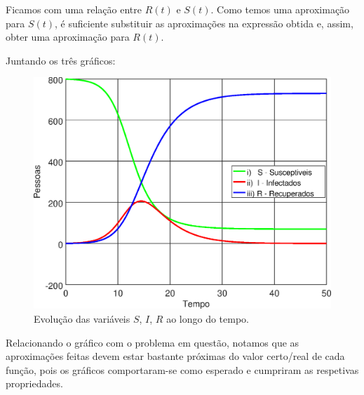 \documentclass[portuguese, a4paper]{article}
\begin{document}
		\par
		Ficamos com uma relação entre $R(t)$ e $S(t)$. Como temos uma
		aproximação para $S(t)$, é suficiente substituir as aproximações na
		expressão obtida e, assim, obter uma aproximação para $R(t)$.

		\par
		Juntando os três gráficos:

		\begin{figure}[H]
			\centering
			\includegraphics[width=0.80\linewidth]{IIIc_fitted}
			\captionsetup{width=0.80\linewidth}
			\caption[Caption]{Evolução das variáveis $S$, $I$, $R$ ao longo do
			tempo.
			\footnotemark}
		\end{figure}

		\par
		Relacionando o gráfico com o problema em questão, notamos que as aproximações feitas devem estar
		bastante próximas do valor certo/real de cada função, pois os gráficos comportaram-se como esperado e cumpriram as respetivas propriedades.
\end{document}
